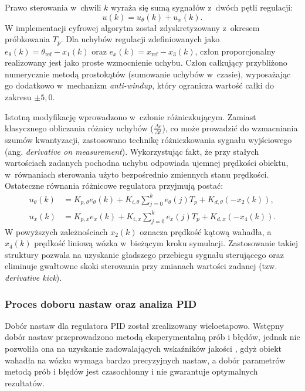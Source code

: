 Prawo sterowania w~chwili $k$ wyraża się sumą sygnałów z~dwóch pętli regulacji:
\begin{equation}
    u(k) =  u_{\theta}(k) + u_{x}(k).
\end{equation}
W implementacji cyfrowej algorytm został zdyskretyzowany z~okresem próbkowania $T_p$. Dla uchybów regulacji zdefiniowanych jako $e_{\theta}(k) = \theta_{\mathrm{ref}} - x_1(k)$ oraz $e_x(k) = x_{\mathrm{ref}} - x_3(k)$, człon proporcjonalny realizowany jest jako proste wzmocnienie uchybu. Człon całkujący przybliżono numerycznie metodą prostokątów (sumowanie uchybów w~czasie), wyposażając go dodatkowo w~mechanizm \textit{anti-windup}, który ogranicza wartość całki do zakresu $\pm 5{,}0$. 

Istotną modyfikację wprowadzono w~członie różniczkującym. Zamiast klasycznego obliczania różnicy uchybów ($\frac{\Delta e}{\Delta t}$), co może prowadzić do wzmacniania szumów kwantyzacji, zastosowano technikę różniczkowania sygnału wyjściowego (ang. \textit{derivative on measurement}). Wykorzystując fakt, że przy stałych wartościach zadanych pochodna uchybu odpowiada ujemnej prędkości obiektu, w~równaniach sterowania użyto bezpośrednio zmiennych stanu prędkości. Ostateczne równania różnicowe regulatora przyjmują postać:
\begin{align}
    u_{\theta}(k) &= K_{p,\theta} e_{\theta}(k) + K_{i,\theta} \sum_{j=0}^{k} e_{\theta}(j) T_p + K_{d,\theta} \left( -x_2(k) \right), \label{eq:pd_theta} \\
    u_{x}(k) &= K_{p,x} e_x(k) + K_{i,x} \sum_{j=0}^{k} e_x(j) T_p + K_{d,x} \left( -x_4(k) \right). \label{eq:pd_x}
\end{align}
W powyższych zależnościach $x_2(k)$ oznacza prędkość kątową wahadła, a~$x_4(k)$ prędkość liniową wózka w~bieżącym kroku symulacji. Zastosowanie takiej struktury pozwala na uzyskanie gładszego przebiegu sygnału sterującego oraz eliminuje gwałtowne skoki sterowania przy zmianach wartości zadanej (tzw. \textit{derivative kick}).

\subsubsection{Proces doboru nastaw oraz analiza PID}
Dobór nastaw dla regulatora PID został zrealizowany wieloetapowo.
Wstępny dobór nastaw przeprowadzono metodą eksperymentalną prób i błędów, 
jednak nie pozwoliła ona na uzyskanie zadowalających wskaźników jakości
, gdyż obiekt wahadła na wózku wymaga bardzo precyzyjnych nastaw, 
a dobór parametrów metodą prób i błędów jest czasochłonny i nie gwarantuje optymalnych rezultatów. 

